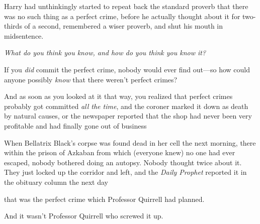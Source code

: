 Harry had unthinkingly started to repeat back the standard proverb that there
was no such thing as a perfect crime, before he actually thought about it for
two-thirds of a second, remembered a wiser proverb, and shut his mouth in
midsentence.

\emph{What do you think you know, and how do you think you know it?}

If you \emph{did} commit the perfect crime, nobody would ever find out—so how
could anyone possibly \emph{know} that there weren't perfect crimes?

And as soon as you looked at it that way, you realized that perfect crimes
probably got committed \emph{all the time}, and the coroner marked it down as
death by natural causes, or the newspaper reported that the shop had never been
very profitable and had finally gone out of business{\el}

When Bellatrix Black's corpse was found dead in her cell the next morning,
there within the prison of Azkaban from which (everyone knew) no one had ever
escaped, nobody bothered doing an autopsy. Nobody thought twice about it. They
just locked up the corridor and left, and the \emph{Daily Prophet} reported it
in the obituary column the next day{\el}

{\el} that was the perfect crime which Professor Quirrell had planned.

And it wasn't Professor Quirrell who screwed it up.
